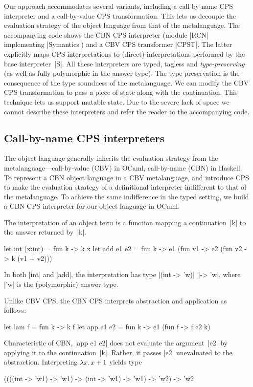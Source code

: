 Our approach accommodates
several variants, including
a call-by-name CPS interpreter and a call-by-value CPS
transformation.
\ifshort\label{state}\label{S:CPS}%
This lets us decouple the evaluation strategy of the object language
from that of the metalanguage. The accompanying code shows the CBN CPS
interpreter (module |RCN| implementing |Symantics|) and a CBV CPS
transformer |CPST|. The latter explicitly maps CPS interpretations to
(direct) interpretations performed by the base interpreter~|S|. All
these interpreters are typed, tagless and \emph{type-preserving} (as
well as fully polymorphic in the answer-type). The type preservation
is the consequence of the type soundness of the metalanguage.  We can
modify the CBV CPS transformation to pass a piece of state along with
the continuation. This technique lets us support mutable state.  Due
to the severe lack of space we cannot describe these interpreters and
refer the reader to the accompanying code.

\else

\subsection{Call-by-name CPS interpreters}\label{S:CPS}

The object language generally inherits the evaluation strategy from
the metalanguage---call-by-value (CBV) in OCaml, call-by-name (CBN) in
Haskell.  To represent a CBN object language in a CBV metalanguage,
\citet{reynolds-definitional,reynolds-relation} and \citet{PlotkinCBN}
introduce CPS to make the evaluation strategy of a definitional
interpreter indifferent to that of the metalanguage. To achieve the same
indifference in the typed setting, we build a CBN CPS interpreter for
our object language in OCaml.

The interpretation of an object term is a function
mapping a continuation~|k| to the answer
returned by~|k|.
\begin{code}
let int (x:int) = fun k -> k x
let add e1 e2 = fun k -> e1 (fun v1 -> e2 (fun v2 -> k (v1 + v2)))
\end{code}
In both |int| and |add|, the interpretation has type 
|(int -> 'w)|\texttt{ }|-> 'w|, where |'w| is the (polymorphic) answer type.

Unlike CBV CPS, the CBN CPS interprets
abstraction and application as follows:
\begin{code}
let lam f = fun k -> k f
let app e1 e2 = fun k -> e1 (fun f -> f e2 k)
\end{code}
Characteristic of CBN, |app e1 e2|
does not evaluate the argument~|e2| by applying it to the
continuation~|k|. Rather, it passes |e2| unevaluated to the abstraction.
Interpreting $\mathopen{\lambda\mathord{x}.\,} x+1$ yields type
\begin{code}
((((int -> 'w1) -> 'w1) -> (int -> 'w1) -> 'w1) -> 'w2) -> 'w2
\end{code}

